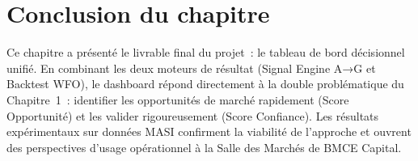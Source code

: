 \section*{Conclusion du chapitre}

Ce chapitre a présenté le livrable final du projet~: le tableau de bord décisionnel
unifié. En combinant les deux moteurs de résultat (Signal Engine A→G et Backtest WFO),
le dashboard répond directement à la double problématique du Chapitre~1~: identifier
les opportunités de marché rapidement (Score Opportunité) et les valider rigoureusement
(Score Confiance). Les résultats expérimentaux sur données MASI confirment la viabilité
de l'approche et ouvrent des perspectives d'usage opérationnel à la Salle des Marchés
de BMCE Capital.
